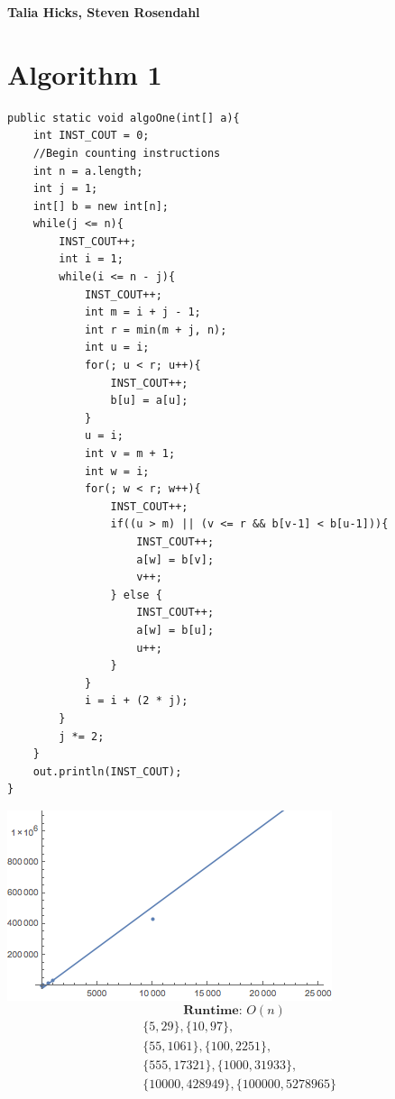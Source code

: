 \documentclass{hw}
\begin{document}
\noindent\textbf{Talia Hicks, Steven Rosendahl}

\section*{Algorithm 1}

\hspace{-1cm}

\begin{minipage}[t]{0.5\textwidth}

\vspace{-4.5cm}

\begin{verbatim}
public static void algoOne(int[] a){
    int INST_COUT = 0;
    //Begin counting instructions
    int n = a.length;
    int j = 1;
    int[] b = new int[n];
    while(j <= n){
        INST_COUT++;
        int i = 1;
        while(i <= n - j){
            INST_COUT++;
            int m = i + j - 1;
            int r = min(m + j, n);
            int u = i;
            for(; u < r; u++){
                INST_COUT++;
                b[u] = a[u];
            }
            u = i;
            int v = m + 1;
            int w = i;
            for(; w < r; w++){
                INST_COUT++;
                if((u > m) || (v <= r && b[v-1] < b[u-1])){
                    INST_COUT++;
                    a[w] = b[v];
                    v++;
                } else {
                    INST_COUT++;
                    a[w] = b[u];
                    u++;
                }
            }
            i = i + (2 * j);
        }
        j *= 2;
    }
    out.println(INST_COUT);
}
\end{verbatim}
\end{minipage}
\begin{minipage}[t]{0.5\textwidth}

\includegraphics[scale=0.6]{ag1}
\[
\textbf{Runtime: }O(n)
\]
\begin{align*}
&\{5, 29\}, \{10, 97\},\\
&\{55, 1061\}, \{100, 2251\},\\
&\{555, 17321\}, \{1000, 31933\},\\
&\{10000, 428949\}, \{100000, 5278965\}\\
\end{align*}
\end{minipage}
\end{document}
